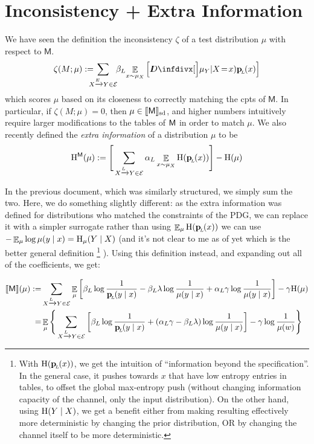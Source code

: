 \documentclass{article}
\newcommand{\bp}[1][L]{\mat{p}_{\!_#1\!}}
\newcommand{\Ed}{\mathcal E}
\newcommand{\sfM}{\mathsf M}
\newcommand\SD{_{\text{sd}}}
\begin{document}
	
	\section{Inconsistency + Extra Information}
			
	We have seen the definition the inconsistency $\zeta$ of a test distribution $\mu$ with respect to $\sfM$.
	\[
		\zeta(M ; \mu) := %
		\!\!\!\!\!\sum_{ X \xrightarrow{\!\!E} Y  \in \Ed }\!\! \beta_L \! \mathop{\mathbb E}_{x \sim \mu_X} \left[\kldiv[\Big]{ \mu_Y | X \!=\! x) }{\bp(x) } \right]
	\] 
	which scores $\mu$ based on its closeness to correctly matching the cpts of $\sfM$. In particular, if $\zeta(M;\mu) = 0$, then $\mu \in \bbr{\sfM}\SD$, and higher numbers intuitively require larger modifications to the tables of $\sf M$ in order to match $\mu$.     
	We also recently defined the \emph{extra information} of a distribution $\mu$ to be
	\[ \H^{\sfM}(\mu) := \Bigg[\sum_{ X \xrightarrow{\!\!L} Y  \in \Ed } \alpha_L \E_{x \sim \mu_X}  \H (\bp (x)) \Bigg] - \H(\mu) \] 
	
	In the previous document, which was similarly structured, we simply sum the two. Here, we do something slightly different: as the extra information was defined for distributions who matched the constraints of the PDG, we can replace it with a simpler surrogate rather than using $\E_\mu\H(\bp(x))$ we can use $- \mathop{\mathbb E}_\mu \log \mu(y \mid x) = \mathrm{H}_\mu(Y \mid X)$ (and it's not clear to me as of yet which is the better general definition%
		\footnote{With $\H(\bp(x))$, we get the intuition of ``information beyond the specification''. In the general case, it pushes towards $x$ that have low entropy entries in tables, to offset the global max-entropy push (without changing information capacity of the channel, only the input distribution). On the other hand, using $\mathrm{H}(Y \mid X)$, we get a benefit either from making resulting effectively more deterministic by changing the prior distribution, OR by changing the channel itself to be more deterministic. }%
	). Using this definition instead, and expanding out all of the coefficients, we get:
	
	\begin{align*}
		\bbr{\sfM}(\mu) :=&\sum_{ X \xrightarrow{\!\!L} Y  \in \Ed } \E_\mu  \left[
			\beta_L \log \frac{1}{\bp(y\mid x)} - \beta_L \lambda \log \frac{1}{\mu(y \mid x)} + \alpha_L \gamma \log \frac{1}{\mu(y\mid x)}  \right] - \gamma \H(\mu) \\
			=&\E_\mu \Bigg\{   \sum_{ X \xrightarrow{\!\!L} Y  \in \Ed } \left[
			\beta_L \log \frac{1}{\bp(y\mid x)} + (\alpha_L \gamma - \beta_L \lambda) \log \frac{1}{\mu(y \mid x)} \right] - \gamma \log \frac{1}{\mu(w)} \Bigg\} 
	\end{align*}
\end{document}
